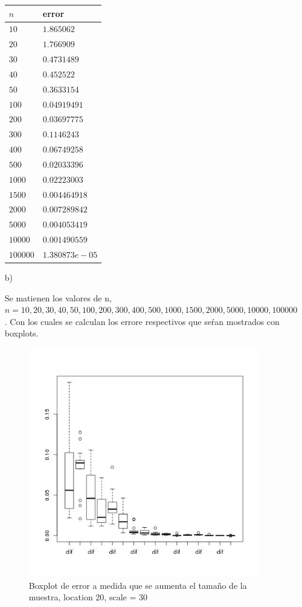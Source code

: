 \documentclass[letter,10pt]{article}
\begin{document}
\begin{itemize}
\begin{table}[H]
    \centering
    \begin{tabular}{|l|l|}
    \hline
    $n$ & error \\ \hline
    $10    $  &    $1.865062  $\\
    $20    $  &    $1.766909 $\\
    $30    $  &    $0.4731489$   \\
    $40    $  &    $0.452522 $  \\
    $50    $  &    $0.3633154 $   \\
    $100   $  &    $0.04919491$    \\
    $200   $  &    $0.03697775$    \\
    $300   $  &    $0.1146243$    \\
    $400   $  &    $0.06749258$     \\
    $500   $  &    $0.02033396 $     \\
    $1000  $   &   $0.02223003$     \\
    $1500  $  &    $0.004464918 $   \\
    $2000  $  &    $0.007289842$    \\
    $5000  $  &    $0.004053419 $     \\
    $10000 $   &   $0.001490559$   \\
    $100000$   &   $1.380873e-05$   \\ \hline
    \end{tabular}
\end{table}
      



 \item[b)]
 
    Se matienen los valores de n, $n=10,20,30,40,50,100,200,300,400,500,1000,1500,2000,5000,10000,100000$. Con los cuales se calculan los errore respectivos que seŕan mostrados 
    con boxplots.
       \begin{figure}[H]
	      \centering
              \includegraphics[width=100mm, scale=0.3]{p5b_boxplot_dif.jpg}
              \caption{Boxplot de error a medida que se aumenta el tamaño de la muestra, location 20, scale = 30}
          \end{figure}


\end{itemize}
\end{document}

